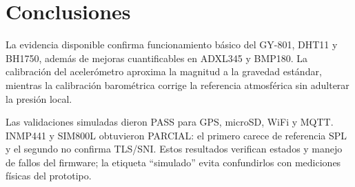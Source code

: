 \documentclass[11pt,a4paper,oneside]{report}
\begin{document}
\chapter{Conclusiones}
La evidencia disponible confirma funcionamiento básico del GY-801, DHT11 y BH1750,
además de mejoras cuantificables en ADXL345 y BMP180. La calibración del acelerómetro
aproxima la magnitud a la gravedad estándar, mientras la calibración barométrica
corrige la referencia atmosférica sin adulterar la presión local.

Las validaciones simuladas dieron PASS para GPS, microSD, WiFi y MQTT. INMP441 y
SIM800L obtuvieron PARCIAL: el primero carece de referencia SPL y el segundo no
confirma TLS/SNI. Estos resultados verifican estados y manejo de fallos del firmware;
la etiqueta ``simulado'' evita confundirlos con mediciones físicas del prototipo.
\end{document}
